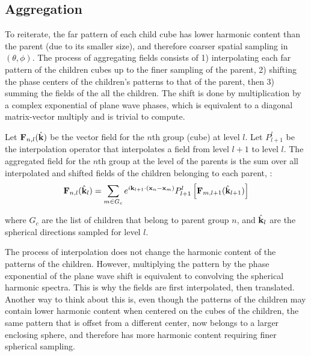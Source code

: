 \subsection{Aggregation}

To reiterate, the far pattern of each child cube has lower harmonic content than the parent (due to its smaller size), and therefore coarser spatial sampling in $(\theta,\phi)$. The process of aggregating fields consists of 1) interpolating each far pattern of the children cubes up to the finer sampling of the parent, 2) shifting the phase centers of the children's patterns to that of the parent, then 3) summing the fields of the all the children. The shift is done by multiplication by a complex exponential of plane wave phases, which is equivalent to a diagonal matrix-vector multiply and is trivial to compute. 

Let $\mathbf{F}_{n,l}(\hat {\mathbf{k}})$ be the vector field for the $n$th group (cube) at level $l$.  Let $P_{l+1}^{l}$ be the interpolation operator that interpolates a field from level $l+1$ to level $l$. The aggregated field for the $n$th group at the level of the parents is the sum over all interpolated and shifted fields of the children belonging to each parent, \cite{yucel2008helmholtz}:
\begin{equation}
\mathbf{F}_{n,l}(\hat {\mathbf{k}}_{l}) = \sum_{m \in G_c} e^{i\mathbf{k}_{l+1} \cdot (\mathbf{x}_{n} - \mathbf{x}_{m}) } P_{l+1}^{l}\left[\mathbf{F}_{m,l+1}(\hat{ \mathbf{k}}_{l+1})\right]
\end{equation}

\noindent where $G_c$ are the list of children that belong to parent group $n$, and $\hat {\mathbf{k}}_{l}$ are the spherical directions sampled for level $l$.

The process of interpolation does not change the harmonic content of the patterns of the children. However, multiplying the pattern by the phase exponential of the plane wave shift is equivalent to convolving the spherical harmonic spectra. This is why the fields are first interpolated, then translated. Another way to think about this is, even though the patterns of the children may contain lower harmonic content when centered on the cubes of the children, the same pattern that is offset from a different center, now belongs to a larger enclosing sphere, and therefore has more harmonic content requiring finer spherical sampling.

